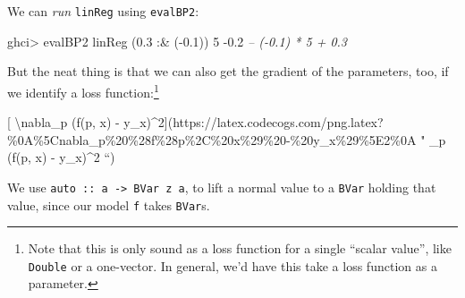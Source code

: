 \documentclass[]{article}
\newenvironment{Shaded}{}{}
\newcommand{\CommentTok}[1]{\textcolor[rgb]{0.38,0.63,0.69}{\textit{#1}}}
\newcommand{\DataTypeTok}[1]{\textcolor[rgb]{0.56,0.13,0.00}{#1}}
\newcommand{\DecValTok}[1]{\textcolor[rgb]{0.25,0.63,0.44}{#1}}
\newcommand{\FloatTok}[1]{\textcolor[rgb]{0.25,0.63,0.44}{#1}}
\newcommand{\FunctionTok}[1]{\textcolor[rgb]{0.02,0.16,0.49}{#1}}
\newcommand{\NormalTok}[1]{#1}
\newcommand{\OtherTok}[1]{\textcolor[rgb]{0.00,0.44,0.13}{#1}}
\begin{document}
We can \emph{run} \texttt{linReg} using \texttt{evalBP2}:

\begin{Shaded}
\begin{Highlighting}[]
\NormalTok{ghci}\FunctionTok{>}\NormalTok{ evalBP2 linReg (}\FloatTok{0.3} \FunctionTok{:&}\NormalTok{ (}\FunctionTok{-}\FloatTok{0.1}\NormalTok{)) }\DecValTok{5}
\FunctionTok{-}\FloatTok{0.2}        \CommentTok{-- (-0.1) * 5 + 0.3}
\end{Highlighting}
\end{Shaded}

But the neat thing is that we can also get the gradient of the parameters, too,
if we identify a loss function:\footnote{Note that this is only sound as a loss
  function for a single ``scalar value'', like \texttt{Double} or a one-vector.
  In general, we'd have this take a loss function as a parameter.}

{[} \textbackslash{}nabla\_p (f(p, x) -
y\_x)\^{}2{]}(https://latex.codecogs.com/png.latex?\%0A\%5Cnabla\_p\%20\%28f\%28p\%2C\%20x\%29\%20-\%20y\_x\%29\%5E2\%0A
" \nabla\_p (f(p, x) - y\_x)\^{}2 ``)

\begin{Shaded}
\end{Shaded}

We use \texttt{auto\ ::\ a\ -\textgreater{}\ BVar\ z\ a}, to lift a normal value
to a \texttt{BVar} holding that value, since our model \texttt{f} takes
\texttt{BVar}s.
\end{document}
